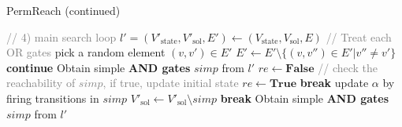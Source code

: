 \begin{algorithm}
\caption{PermReach (continued)}
\begin{algorithmic}
    \State \textcolor{gray}{// 4) main search loop} %
        \State $l'=(V'_{\mathrm{state}}, V'_{\mathrm{sol}},E')\gets(V_{\mathrm{state}}, V_{\mathrm{sol}},E)$
         \textcolor{gray}{// Treat each OR gates}
            \State pick a random element $(v,v') \in E'$
            \State $E'\gets E' \setminus  \{(v,v'') \in E'| v''\neq v'\}$
        \EndFor
            \State \textbf{continue}
        \EndIf
        \State Obtain simple \textbf{AND gates} $simp$ from $l'$
            \State $re\gets\mathbf{False}$ 
            \State\textcolor{gray}{// check the reachability of $simp$, if true, update initial state}
                    \State $re\gets\mathbf{True}$
                    \State \textbf{break}
                \EndIf
            \EndFor
                \State update $\alpha$ by firing transitions in $simp$
                \State $V'_{\mathrm{sol}}\gets V'_{\mathrm{sol}} \setminus simp$
            \Else
                \State \textbf{break}
            \EndIf
            \State Obtain simple \textbf{AND gates} $simp$ from $l'$
        \EndWhile
            \State{}
        \EndIf
    \EndFor %
    \State {}
\end{algorithmic}
\end{algorithm}

